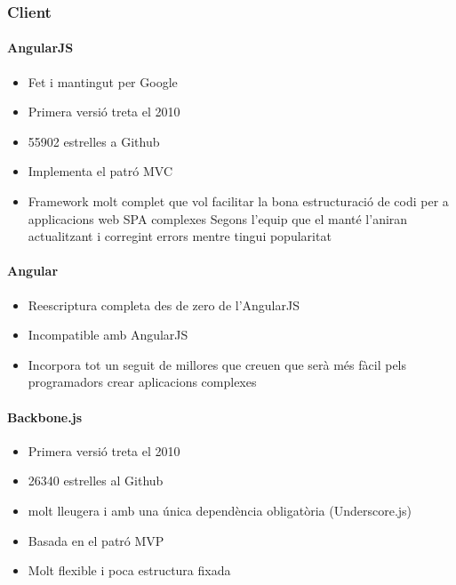 \documentclass[12pt, titlepage]{article}
\begin{document}
\subsubsection{Client}
\paragraph{AngularJS}
\begin{itemize}
\item Fet i mantingut per Google
\item Primera versió treta el 2010
\item 55902 estrelles a Github
\item Implementa el patró MVC
\item Framework molt complet que vol facilitar la bona estructuració de codi per
a applicacions web SPA complexes Segons l’equip que el manté l’aniran actualitzant
i corregint errors mentre tingui popularitat
\end{itemize}

\paragraph{Angular}
\begin{itemize}
\item Reescriptura completa des de zero de l’AngularJS
\item Incompatible amb AngularJS
\item Incorpora tot un seguit de millores que creuen que serà més fàcil pels
programadors crear aplicacions complexes
\end{itemize}

\paragraph{Backbone.js}
\begin{itemize}
\item Primera versió treta el 2010
\item 26340 estrelles al Github
\item molt lleugera i amb una única dependència obligatòria (Underscore.js)
\item Basada en el patró MVP
\item Molt flexible i poca estructura fixada
\end{itemize}
\end{document}
